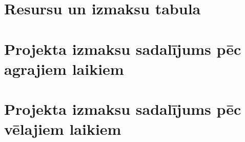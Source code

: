 \section{Resursu un izmaksu tabula}
	\label{app:Projekta_resursu_izmaksu_tabula}
    \begin{figure}
        
    \end{figure}
    \clearpage
    \begin{figure}
        
    \end{figure}
    \clearpage
    \begin{figure}
        
    \end{figure}
    \clearpage
    \begin{figure}
        
    \end{figure}
    \clearpage
    \begin{figure}
        
    \end{figure}
    \clearpage
    \begin{figure}
        
    \end{figure}
    \clearpage
\section{Projekta izmaksu sadalījums pēc agrajiem laikiem}
	\label{app:Projekta_izmaksu_salidzinajums_agrais}
    \begin{figure}
        
    \end{figure}
    \clearpage
    \begin{figure}[t]
        
    \end{figure}
    \clearpage
\section{Projekta izmaksu sadalījums pēc vēlajiem laikiem}
	\label{app:Projekta_izmaksu_salidzinajums_velais}
    \begin{figure}
        
    \end{figure}
    \clearpage
    \begin{figure}[t]
        
    \end{figure}
    \clearpage
